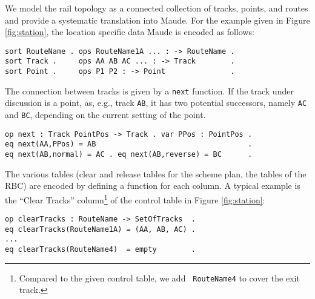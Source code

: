 We model the rail topology as a connected collection of tracks,
points, and routes and provide a systematic translation into
Maude. For the example given in Figure \ref{fig:station}, the location
specific data Maude is encoded as follows:
%
\begin{lstlisting}[columns=fixed]
sort RouteName . ops RouteName1A ... : -> RouteName .
sort Track .     ops AA AB AC ... : -> Track        .
sort Point .     ops P1 P2 : -> Point               . 
\end{lstlisting}
%
The connection between tracks is given by a \verb|next| function. If
the track under discussion is a point, as, e.g., track \verb|AB|, it
has two potential successors, namely \verb|AC| and
\verb|BC|, depending on the current setting of the point.
%
\begin{lstlisting}[columns=fixed]
op next : Track PointPos -> Track . var PPos : PointPos .
eq next(AA,PPos) = AB                                   .
eq next(AB,normal) = AC . eq next(AB,reverse) = BC      .
\end{lstlisting}

The various tables (clear and release tables for the scheme plan, the
tables of the RBC) are encoded by defining a function for each
column. A typical example is the ``Clear Tracks''
column\footnote{Compared to the given control table, we add {\tt
RouteName4} to cover the exit track.} of the control table in
Figure \ref{fig:station}:
%
\begin{lstlisting}[columns=fixed]
op clearTracks : RouteName -> SetOfTracks  .
eq clearTracks(RouteName1A) = (AA, AB, AC) . 
...
eq clearTracks(RouteName4)  = empty        .
\end{lstlisting}
